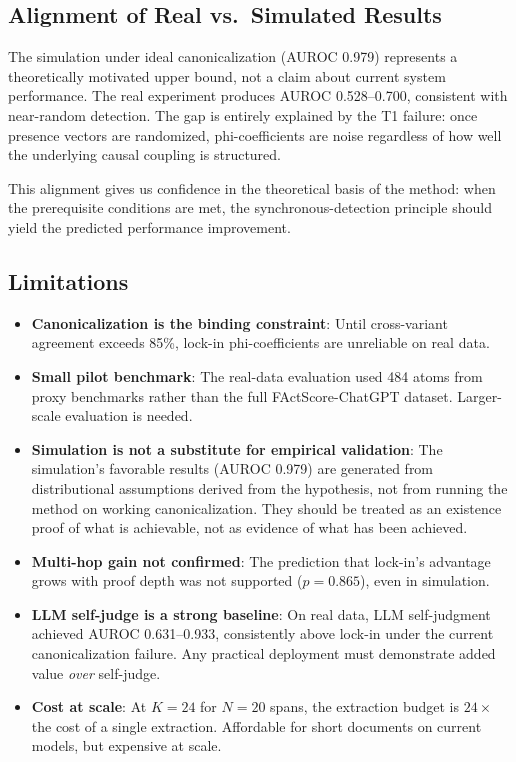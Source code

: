 \documentclass[11pt,letterpaper]{article}
\begin{document}
\subsection{Alignment of Real vs.\ Simulated Results}

The simulation under ideal canonicalization (AUROC 0.979) represents a theoretically motivated upper bound, not a
claim about current system performance. The real experiment produces AUROC 0.528--0.700, consistent with near-random
detection. The gap is entirely explained by the T1 failure: once presence vectors are randomized, phi-coefficients are
noise regardless of how well the underlying causal coupling is structured.

This alignment gives us confidence in the theoretical basis of the method: when the prerequisite conditions are met,
the synchronous-detection principle should yield the predicted performance improvement.

\subsection{Limitations}

\begin{itemize}
  \item \textbf{Canonicalization is the binding constraint}: Until cross-variant agreement exceeds 85\%, lock-in
    phi-coefficients are unreliable on real data.
  \item \textbf{Small pilot benchmark}: The real-data evaluation used 484 atoms from proxy benchmarks rather than the
    full FActScore-ChatGPT dataset. Larger-scale evaluation is needed.
  \item \textbf{Simulation is not a substitute for empirical validation}: The simulation's favorable results
    (AUROC 0.979) are generated from distributional assumptions derived from the hypothesis, not from running the
    method on working canonicalization. They should be treated as an existence proof of what is achievable, not as
    evidence of what has been achieved.
  \item \textbf{Multi-hop gain not confirmed}: The prediction that lock-in's advantage grows with proof depth was not
    supported ($p = 0.865$), even in simulation.
  \item \textbf{LLM self-judge is a strong baseline}: On real data, LLM self-judgment achieved AUROC 0.631--0.933,
    consistently above lock-in under the current canonicalization failure. Any practical deployment must demonstrate
    added value \emph{over} self-judge.
  \item \textbf{Cost at scale}: At $K=24$ for $N=20$ spans, the extraction budget is $24\times$ the cost of a single
    extraction. Affordable for short documents on current models, but expensive at scale.
\end{itemize}
\end{document}
